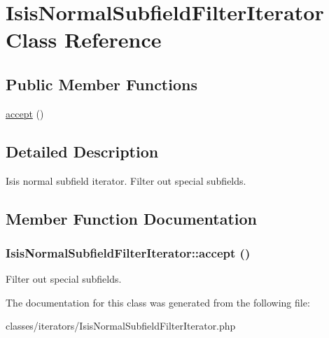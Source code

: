 \hypertarget{classIsisNormalSubfieldFilterIterator}{
\section{IsisNormalSubfieldFilterIterator Class Reference}
\label{classIsisNormalSubfieldFilterIterator}
}
\subsection*{Public Member Functions}
\begin{DoxyCompactItemize}
\item 
\hyperlink{classIsisNormalSubfieldFilterIterator_a855e83f44d790d75c2bcc9bdeedef317}{accept} ()
\end{DoxyCompactItemize}


\subsection{Detailed Description}
Isis normal subfield iterator. Filter out special subfields. 

\subsection{Member Function Documentation}
\hypertarget{classIsisNormalSubfieldFilterIterator_a855e83f44d790d75c2bcc9bdeedef317}{
\subsubsection[{accept}]{\setlength{\rightskip}{0pt plus 5cm}IsisNormalSubfieldFilterIterator::accept ()}}
\label{classIsisNormalSubfieldFilterIterator_a855e83f44d790d75c2bcc9bdeedef317}
Filter out special subfields. 

The documentation for this class was generated from the following file:\begin{DoxyCompactItemize}
\item 
classes/iterators/IsisNormalSubfieldFilterIterator.php\end{DoxyCompactItemize}
